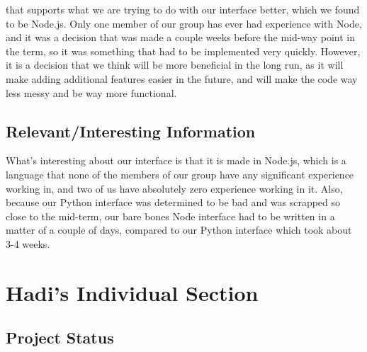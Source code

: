 \documentclass[onecolumn, draftclsnofoot,10pt, compsoc]{IEEEtran}
\begin{document}
that supports what we are trying to do with our interface better, which we found to be Node.js. Only one member of our group has ever had experience with Node, and it was a decision that was made a couple weeks before the mid-way point in the term, so it was something that had to be implemented very quickly. However, it is a decision that we think will be more beneficial in the long run, as it will make adding additional features easier in the future, and will make the code way less messy and be way more functional.

\subsection{Relevant/Interesting Information}

What's interesting about our interface is that it is made in Node.js, which is a language that none of the members of our group have any significant experience working in, and two of us have absolutely zero experience working in it. Also, because our Python interface was determined to be bad and was scrapped so close to the mid-term, our bare bones Node interface had to be written in a matter of a couple of days, compared to our Python interface which took about 3-4 weeks.

\section{Hadi's Individual Section}
\subsection{Project Status}
\end{document}
